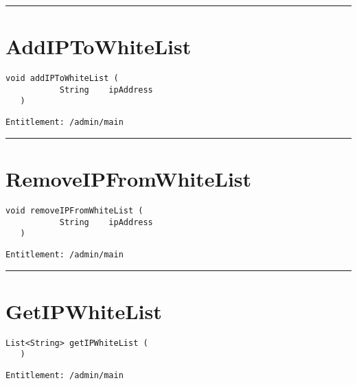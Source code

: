 \rule{12cm}{2pt}
\section{AddIPToWhiteList}
\label{Api:AddIPToWhiteList}
\begin{lstlisting}[style=nonumbers]
   void addIPToWhiteList (
           String    ipAddress
   )
\end{lstlisting}
\begin{Verbatim}[formatcom=\color{Maroon}]
  Entitlement: /admin/main
\end{Verbatim}



\rule{12cm}{2pt}
\section{RemoveIPFromWhiteList}
\label{Api:RemoveIPFromWhiteList}
\begin{lstlisting}[style=nonumbers]
   void removeIPFromWhiteList (
           String    ipAddress
   )
\end{lstlisting}
\begin{Verbatim}[formatcom=\color{Maroon}]
  Entitlement: /admin/main
\end{Verbatim}



\rule{12cm}{2pt}
\section{GetIPWhiteList}
\label{Api:GetIPWhiteList}
\begin{lstlisting}[style=nonumbers]
   List<String> getIPWhiteList (
   )
\end{lstlisting}
\begin{Verbatim}[formatcom=\color{Maroon}]
  Entitlement: /admin/main
\end{Verbatim}



